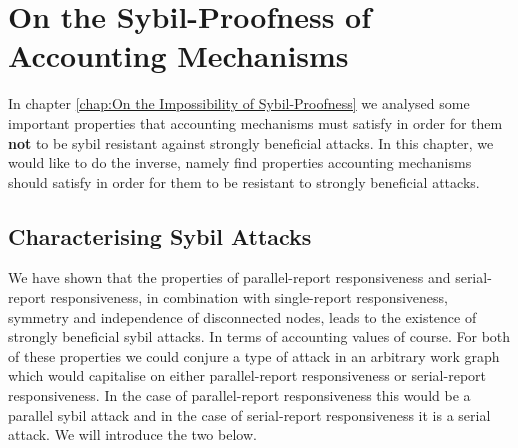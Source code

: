 \chapter{On the Sybil-Proofness of Accounting Mechanisms}
\label{chap:Sybil-Proofness of Accounting Mechanisms}

\noindent{}In chapter \ref{chap:On the Impossibility of Sybil-Proofness} we analysed some important properties that accounting mechanisms must satisfy in order for them {\bf not} to be sybil resistant against strongly beneficial attacks. In this chapter, we would like to do the inverse, namely find properties accounting mechanisms should satisfy in order for them to be resistant to strongly beneficial attacks. \vspace{1em}\\


\section{Characterising Sybil Attacks}
\label{sec:Characterising Sybil Attacks}
\noindent{}We have shown that the properties of parallel-report responsiveness and serial-report responsiveness, in combination with single-report responsiveness, symmetry and independence of disconnected nodes, leads to the existence of strongly beneficial sybil attacks. In terms of accounting values of course. For both of these properties we could conjure a type of attack in an arbitrary work graph which would capitalise on either parallel-report responsiveness or serial-report responsiveness. In the case of parallel-report responsiveness this would be a parallel sybil attack and in the case of serial-report responsiveness it is a serial attack. We will introduce the two below. \vspace{1em}\\


